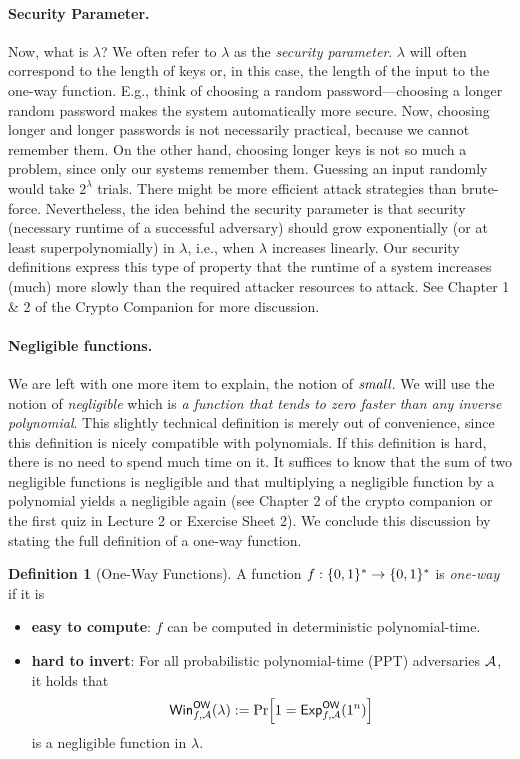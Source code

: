 \documentclass[a4paper,table,dvipsnames]{article}
\theoremstyle{definition}
\newtheorem{definition}{Definition}[section]
\begin{document}
\paragraph{Security Parameter.}
Now, what is $\lambda$? We often refer to $\lambda$ as the \emph{security parameter}. $\lambda$ will often correspond to the length of keys or, in this case, the length of the input to the one-way function. E.g., think of choosing a random password---choosing a longer random password makes the system automatically more secure. Now, choosing longer and longer passwords is not necessarily practical, because we cannot remember them. On the other hand, choosing longer keys is not so much a problem, since only our systems remember them. Guessing an input randomly would take $2^{\lambda}$ trials. There might be more efficient attack strategies than brute-force. Nevertheless, the idea behind the security parameter is that security (necessary runtime of a successful adversary) should grow exponentially (or at least superpolynomially) in $\lambda$, i.e., when $\lambda$ increases linearly. Our security definitions express this type of property that the runtime of a system increases (much) more slowly than the required attacker resources to attack. See Chapter 1 \& 2 of the Crypto Companion for more discussion.

\paragraph{Negligible functions.} We are left with one more item to explain, the notion of $\emph{small}$. We will use the notion of \emph{negligible} which is \emph{a function that tends to zero faster than any inverse polynomial}. This slightly technical definition is merely out of convenience, since this definition is nicely compatible with polynomials. If this definition is hard, there is no need to spend much time on it. It suffices to know that the sum of two negligible functions is negligible and that multiplying a negligible function by a polynomial yields a negligible again (see Chapter 2 of the crypto companion or the first quiz in Lecture 2 or Exercise Sheet 2). We conclude this discussion by stating the full definition of a one-way function.

\begin{definition}[One-Way Functions]\label{sec:OWF}
A function $f:\{0,1\}^*\rightarrow\{0,1\}^*$ is \emph{one-way} if it is
\begin{itemize}
\item \textbf{easy to compute}: $f$ can be computed in deterministic polynomial-time.
\item \textbf{hard to invert}: For all probabilistic polynomial-time (PPT) adversaries $\mathcal{A}$, it holds that
\[{\sf{Win}}_{f,\adv}^{{\sf{OW}}}(\lambda):=\prob{1={\sf{Exp}}_{f,\adv}^{\sf{OW}}(1^n)}\]
is a negligible function in $\lambda$.
\end{itemize}
\end{definition}
\end{document}
